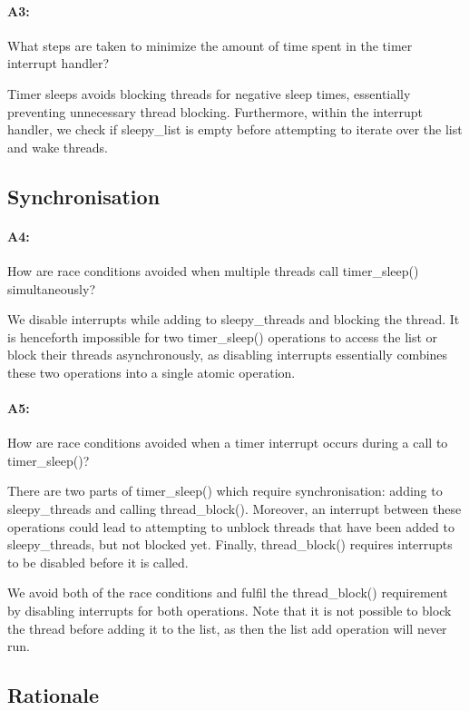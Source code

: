\documentclass[11pt]{article}
\begin{document}
\paragraph{A3:}
What steps are taken to minimize the amount of time spent in the timer interrupt
handler?

Timer sleeps avoids blocking threads for negative sleep times, essentially
preventing unnecessary thread blocking. Furthermore, within the interrupt
handler, we check if sleepy\_list is empty before attempting to iterate over the
list and wake threads.

\subsection{Synchronisation}
\paragraph{A4:}
How are race conditions avoided when multiple threads call timer\_sleep()
simultaneously?

We disable interrupts while adding to sleepy\_threads and blocking the
thread. It is henceforth impossible for two timer\_sleep() operations to access
the list or block their threads asynchronously, as disabling interrupts
essentially combines these two operations into a single atomic operation.

\paragraph{A5:}
How are race conditions avoided when a timer interrupt occurs during a call to
timer\_sleep()?

There are two parts of timer\_sleep() which require synchronisation: adding to
sleepy\_threads and calling thread\_block(). Moreover, an interrupt between
these operations could lead to attempting to unblock threads that have been
added to sleepy\_threads, but not blocked yet. Finally, thread\_block() requires
interrupts to be disabled before it is called.

We avoid both of the race conditions and fulfil the thread\_block() requirement
by disabling interrupts for both operations. Note that it is not possible to
block the thread before adding it to the list, as then the list add operation
will never run.

\subsection{Rationale}
\end{document}
